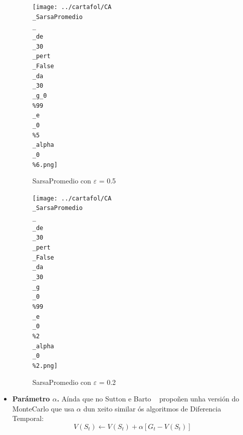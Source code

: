 \documentclass{article}
\begin{document}
\begin{itemize}
		\begin{figure}[htbp]
    \centering
    \begin{minipage}{0.45\textwidth}
        \centering
        \texttt{[image: ../cartafol/CA\\\_SarsaPromedio\\\_\\\_de\\\_30\\\_pert\\\_False\\\_da\\\_30\\\_g\_0\\\%99\\\_e\\\_0\\\%5\\\_alpha\\\_0\\\%6.png]}
\caption*{SarsaPromedio con $\varepsilon$ = 0.5}

    \end{minipage}
    \hfill
    \begin{minipage}{0.45\textwidth}
        \centering
        \texttt{[image: ../cartafol/CA\\\_SarsaPromedio\\\_\\\_de\\\_30\\\_pert\\\_False\\\_da\\\_30\\\_g\\\_0\\\%99\\\_e\\\_0\\\%2\\\_alpha\\\_0\\\%2.png]}
\caption*{SarsaPromedio con $\varepsilon$ = 0.2}

    \end{minipage}
\end{figure}

	\item \textbf{Parámetro $\alpha$.} Aínda que no Sutton e Barto \cite{Sutton1998}  propoñen unha versión do MonteCarlo que usa $\alpha$ dun xeito similar ós algoritmos de Diferencia Temporal:
			\[V(S_t)\leftarrow V(S_t)+\alpha[G_t -V(S_t)]\]


\end{itemize}
\end{document}
